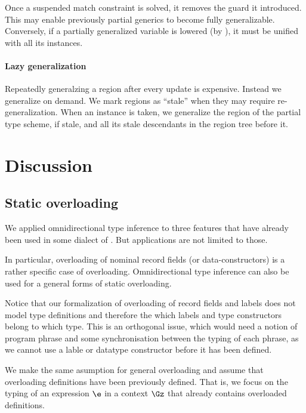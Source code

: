 \documentclass[acmsmall,screen,nonacm,review]{acmart}
\begin{document}
Once a suspended match constraint is solved, it removes the guard it
introduced. This may enable previously partial generics to become fully
generalizable. Conversely, if a partially generalized variable is lowered (\eg by ), it must be unified with all its instances.

\paragraph{Lazy generalization} Repeatedly generalzing a region after every update is expensive.  Instead we generalize on demand. We mark regions as ``stale'' when they may require re-generalization. When an instance is taken, we generalize the region of the partial type scheme, if stale, and all its stale descendants in the region tree before it.

\section{Discussion}
\label{sec:discussion}


\subsection{Static overloading}


We applied omnidirectional type inference to three features that have
already been used in some dialect of \ML.  But applications are not limited
to those.

In particular, overloading of nominal record fields (or data-constructors)
is a rather specific case of overloading.  Omnidirectional type inference can
also be used for a general forms of static overloading.

Notice that our formalization of overloading of record fields and
labels does not model type definitions and therefore the which labels and
type constructors belong to which type.  This is an orthogonal issue, which
would need a notion of program phrase and some  synchronisation between the
typing of each phrase, as we cannot use a lable or datatype constructor
before it has been defined.

We make the same asumption for general overloading and assume that
overloading definitions have been previously defined. That is, we focus on
the typing of an expression $\e$ in a context $\Gz$ that already contains
overloaded definitions.
\end{document}
